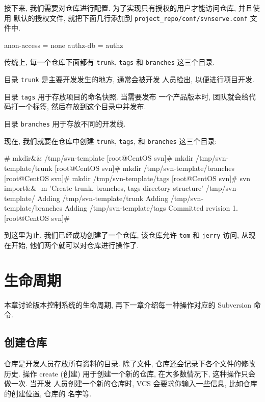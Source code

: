 \documentclass[nofonts, oneside]{ctexart}
\newcommand\svn{\texttt{svn}}
\newcommand\svnim{\texttt{import}}
\begin{document}
接下来, 我们需要对仓库进行配置. 为了实现只有授权的用户才能访问仓库, 并且使用
默认的授权文件, 就把下面几行添加到
\texttt{project\_repo/conf/svnserve.conf}
文件中.
\begin{svnshell}
anon-access = none
authz-db = authz
\end{svnshell}

传统上, 每一个仓库下面都有 \texttt{trunk}, \texttt{tags} 和 \texttt{branches}
这三个目录.

目录 \texttt{trunk} 是主要开发发生的地方, 通常会被开发
人员检出, 以便进行项目开发.

目录 \texttt{tags} 用于存放项目的命名快照. 当需要发布
一个产品版本时, 团队就会给代码打一个标签, 然后存放到这个目录中并发布.

目录 \texttt{branches} 用于存放不同的开发线.

现在, 我们就要在仓库中创建 \texttt{trunk}, \texttt{tags}, 和 \texttt{branches}
这三个目录:
\begin{svnshell}
# mkdir&& /tmp/svn-template
[root@CentOS svn]# mkdir /tmp/svn-template/trunk
[root@CentOS svn]# mkdir /tmp/svn-template/branches
[root@CentOS svn]# mkdir /tmp/svn-template/tags
[root@CentOS svn]# svn import&\index{svn@\svn!\svnim}& -m 'Create trunk, branches, tags directory structure' /tmp/svn-template/
Adding              /tmp/svn-template/trunk
Adding              /tmp/svn-template/branches
Adding              /tmp/svn-template/tags
Committed revision 1.
[root@CentOS svn]#
\end{svnshell}

到这里为止, 我们已经成功创建了一个仓库, 该仓库允许 \texttt{tom} 和
\texttt{jerry} 访问, 从现在开始, 他们两个就可以对仓库进行操作了.

\section{生命周期}
\label{sec:life_cycle}

本章讨论版本控制系统的生命周期, 再下一章介绍每一种操作对应的 Subversion 命令.

\subsection{创建仓库}
\label{subsec:create_repository}

仓库是开发人员存放所有资料的目录. 除了文件, 仓库还会记录下各个文件的修改历史.
操作 create (创建) 用于创建一个新的仓库, 在大多数情况下, 这种操作只会做一次. 当开发
人员创建一个新的仓库时, VCS 会要求你输入一些信息, 比如仓库的创建位置, 仓库的
名字等.
\end{document}
